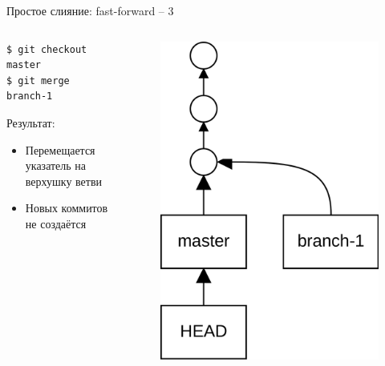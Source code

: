 \documentclass[presentation]{beamer}
\begin{document}
\begin{frame}[fragile]{Простое слияние: fast-forward -- 3}
  \begin{columns}
    \begin{column}{.4\textwidth}
\begin{verbatim}
$ git checkout master
$ git merge branch-1
\end{verbatim}
      Результат:
      \begin{itemize}
      \item Перемещается указатель на верхушку ветви
      \item Новых коммитов не создаётся
      \end{itemize}
      \end{column}
      \begin{column}{.6\textwidth}
        \begin{figure}[htb]
          \centering
          \includegraphics[height=.7\textheight]{git-operation-merge-1-2}
        \end{figure}
      \end{column}
    \end{columns}
\end{frame}
\end{document}
